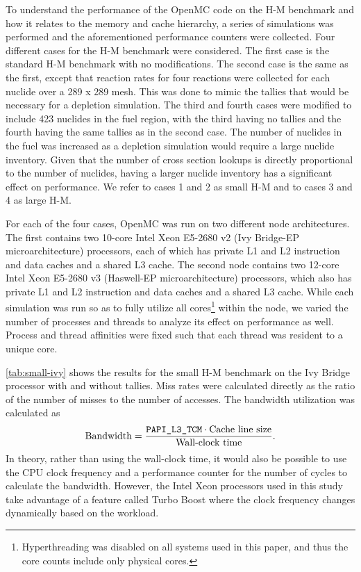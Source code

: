 \documentclass{mc2015}
\begin{document}
To understand the performance of the OpenMC code on the H-M benchmark and how
it relates to the memory and cache hierarchy, a series of simulations was
performed and the aforementioned performance counters were collected. Four
different cases for the H-M benchmark were considered. The first case is the
standard H-M benchmark with no modifications. The second case is the same as
the first, except that reaction rates for four reactions were collected for
each nuclide over a 289 x 289 mesh. This was done to mimic the tallies that
would be necessary for a depletion simulation. The third and fourth cases were
modified to include 423 nuclides in the fuel region, with the third having no
tallies and the fourth having the same tallies as in the second case. The
number of nuclides in the fuel was increased as a depletion simulation would
require a large nuclide inventory. Given that the number of cross section
lookups is directly proportional to the number of nuclides, having a larger
nuclide inventory has a significant effect on performance. We refer to
cases 1 and 2 as small H-M and to cases 3 and 4 as large H-M.

For each of the four cases, OpenMC was run on two different node
architectures. The first contains two 10-core Intel Xeon E5-2680 v2 (Ivy
Bridge-EP microarchitecture) processors, each of which has private L1 and L2
instruction and data caches and a shared L3 cache. The second node contains two
12-core Intel Xeon E5-2680 v3 (Haswell-EP microarchitecture) processors, which
also has private L1 and L2 instruction and data caches and a shared L3
cache. While each simulation was run so as to fully utilize all
cores\footnote{Hyperthreading was disabled on all systems used in this paper,
  and thus the core counts include only physical cores.} within the node, we
varied the number of processes and threads to analyze its effect on performance
as well. Process and thread affinities were fixed such that each thread was
resident to a unique core.

\autoref{tab:small-ivy} shows the results for the small H-M benchmark on the Ivy
Bridge processor with and without tallies. Miss rates were calculated directly
as the ratio of the number of misses to the number of accesses. The bandwidth
utilization was calculated as~\cite{physor-tramm-2014}
\begin{equation}
  \label{eq:bandwidth}
  \text{Bandwidth} = \frac{\text{\texttt{PAPI\_L3\_TCM}}\cdot\text{Cache line
      size}}{\text{Wall-clock time}}.
\end{equation}
In theory, rather than using the wall-clock time, it would also be possible to
use the CPU clock frequency and a performance counter for the number of cycles
to calculate the bandwidth. However, the Intel Xeon processors used in this
study take advantage of a feature called Turbo Boost where the clock frequency
changes dynamically based on the workload.
\end{document}
